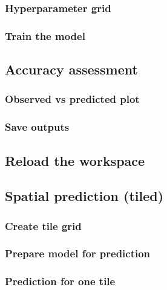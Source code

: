 \documentclass[
  10pt,
  b5paper,
  oneside]{book}
\begin{document}
\subsubsection{Hyperparameter grid}\label{hyperparameter-grid}

\subsubsection{Train the model}\label{train-the-model}

\subsection{Accuracy assessment}\label{accuracy-assessment}

\subsubsection{Observed vs predicted plot}\label{observed-vs-predicted-plot}

\subsubsection{Save outputs}\label{save-outputs}

\subsection{Reload the workspace}\label{reload-the-workspace}

\subsection{Spatial prediction (tiled)}\label{spatial-prediction-tiled}

\subsubsection{Create tile grid}\label{create-tile-grid}

\subsubsection{Prepare model for prediction}\label{prepare-model-for-prediction}

\subsubsection{Prediction for one tile}\label{prediction-for-one-tile}
\end{document}
